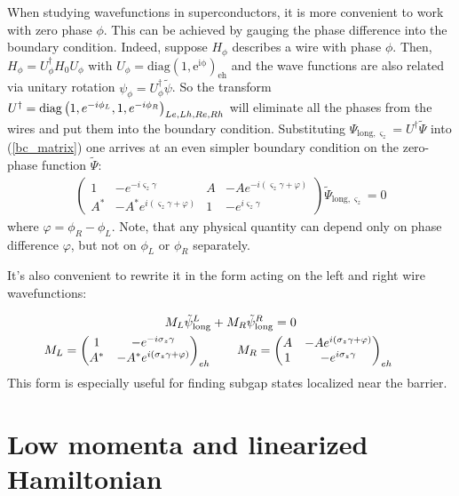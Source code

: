 When studying wavefunctions in superconductors, it is more convenient to work with zero phase $ \phi $. This can be achieved by gauging the phase difference into the boundary condition. Indeed, suppose $ H_{\phi} $ describes a wire with phase $ \phi $. Then, $ H_{\phi}=U_{\phi}^{\dagger}H_{0}U_{\phi} $ with $ U_{\phi}=\mathrm{diag(1,e^{i\phi})_{eh}} $ and the wave functions are also related via unitary rotation $ \psi_{\phi}=U_{\phi}^{\dagger}\tilde{\psi} $. So the transform $ U^{\dagger}=\mathrm{diag}\left(1,e^{-i\phi_L},1,e^{-i\phi_R }\right)_{Le,Lh,Re,Rh}$  will eliminate all the phases from the wires and put them into the boundary condition. Substituting $ \Psi_{\mathrm{long},\varsigma_{z}}=U^{\dagger}\tilde{\Psi} $ into (\ref{bc_matrix}) one arrives at an even simpler boundary condition on the zero-phase function $ \tilde{\Psi} $:
\begin{gather}
\label{bc_matrix_phases}
\begin{pmatrix}1 & -e^{-i\varsigma_{z}\gamma} & A & -Ae^{-i\left(\varsigma_{z}\gamma+\varphi\right)}\\
A^{*} & -A^{*}e^{i\left(\varsigma_{z}\gamma+\varphi\right)} & 1 & -e^{i\varsigma_{z}\gamma}
\end{pmatrix}
\tilde{\Psi}_{\mathrm{long}, \varsigma_{z}}=0
\end{gather}
where $ \varphi=\phi_R-\phi_L $. Note, that any physical quantity can depend only on phase difference $ \varphi $,  but not on $ \phi_L $ or $ \phi_R $ separately.

It's also convenient to rewrite it in the form acting on the left and right wire wavefunctions: 

\begin{gather}
\label{bc_matrix_LR}
M_L\tilde{\psi}_{\mathrm{long}}^L
+
M_R\tilde{\psi}_{\mathrm{long}}^R
=
0
\nonumber
\\
M_L
=
	\begin{pmatrix}
	1 & -e^{-i\sigma_z\gamma}
	\\
	A^* & -A^* e^{i\left(\sigma_z\gamma+\varphi\right)}
	\end{pmatrix}_{eh}
	\qquad
M_R
=
	\begin{pmatrix}
	A & -A e^{i\left(\sigma_z\gamma+\varphi\right)}
	\\
1 & -e^{i\sigma_z\gamma}
\end{pmatrix}_{eh}
\qquad	
\end{gather}
This form is especially useful for finding subgap states localized near the barrier.
\section{Low momenta and linearized Hamiltonian}
\label{sec:linearized_hamiltonian}

